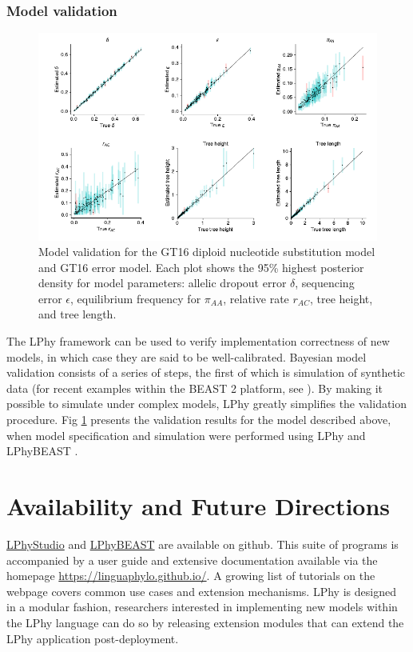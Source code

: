 \documentclass[10pt,letterpaper,table]{article}
\theoremstyle{definition}
\begin{document}
\subsubsection*{Model validation}
\begin{figure}[!h]
    \includegraphics{figs_plos/Fig4.pdf}
    \caption{Model validation for the GT16 diploid nucleotide substitution model and GT16 error model. Each plot shows the 95\% highest posterior density for model parameters: allelic dropout error $\delta$, sequencing error $\epsilon$, equilibrium frequency for $\pi_{AA}$, relative rate $r_{AC}$, tree height, and tree length. }
    \label{fig_validation}
\end{figure}

\noindent The LPhy framework can be used to verify implementation correctness of new models, in which case they are said to be well-calibrated.
Bayesian model validation consists of a series of steps, the first of which is simulation of synthetic data (for recent examples within the BEAST 2 platform, see \cite{gaboriau20,chen2022accounting}). 
By making it possible to simulate under complex models, LPhy greatly simplifies the validation procedure.
Fig \ref{fig_validation} presents the validation results for the model described above, when model specification and simulation were performed using LPhy and LPhyBEAST \cite{chen2022accounting}.

\section*{Availability and Future Directions}
\href{https://github.com/LinguaPhylo/linguaPhylo}{LPhyStudio} and \href{https://github.com/LinguaPhylo/LPhyBeast}{LPhyBEAST} are available on github. 
This suite of programs is accompanied by a user guide and extensive documentation available via the homepage \url{https://linguaphylo.github.io/}.
A growing list of tutorials on the webpage covers common use cases and extension mechanisms. 
LPhy is designed in a modular fashion, researchers interested in implementing new models within the LPhy language can do so by releasing extension modules that can extend the LPhy application post-deployment.
\end{document}
